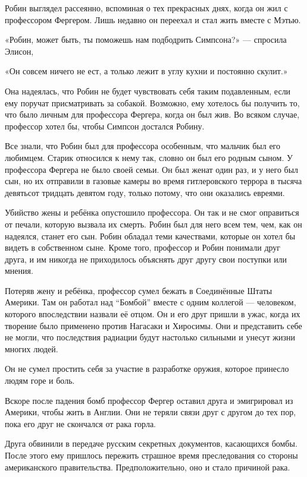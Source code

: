 \documentclass[a5paper, 9pt,
final, openany, twoside=true]{memoir}
\begin{document}
Робин выглядел рассеянно, вспоминая о тех прекрасных днях, когда он жил с профессором Фергером. Лишь недавно он переехал и стал жить вместе с Мэтью.\bigskip

«Робин, может быть, ты поможешь нам подбодрить Симпсона?» — спросила Элисон,

«Он совсем ничего не ест, а только лежит в углу кухни и постоянно скулит.»

Она надеялась, что Робин не будет чувствовать себя таким подавленным, если ему поручат присматривать за собакой. Возможно, ему хотелось бы получить то, что было личным для профессора Фергера, когда он был жив. Во всяком случае, профессор хотел бы, чтобы Симпсон достался Робину.

Все знали, что Робин был для профессора особенным, что мальчик был его любимцем. Старик относился к нему так, словно он был его родным сыном. У профессора Фергера не было своей семьи. Он был женат один раз, и у него был сын, но их отправили в газовые камеры во время гитлеровского террора в тысяча девятьсот тридцать девятом году, только потому, что они оказались евреями.

Убийство жены и ребёнка опустошило профессора. Он так и не смог оправиться от печали, которую вызвала их смерть. Робин был для него всем тем, чем, как он надеялся, станет его сын. Робин обладал теми качествами, которые он хотел бы видеть в собственном сыне. Кроме того, профессор и Робин понимали друг друга, и им никогда не приходилось объяснять друг другу свои поступки или мнения.

Потеряв жену и ребёнка, профессор сумел бежать в Соединённые Штаты Америки. Там он работал над ``Бомбой'' вместе с одним коллегой — человеком, которого впоследствии назвали её отцом. Он и его друг пришли в ужас, когда их творение было применено против Нагасаки и Хиросимы. Они и представить себе не могли, что последствия радиации будут настолько сильными и унесут жизни многих людей.

Он не сумел простить себя за участие в разработке оружия, которое принесло людям горе и боль.

Вскоре после падения бомб профессор Фергер оставил друга и эмигрировал из Америки, чтобы жить в Англии. Они не теряли связи друг с другом до тех пор, пока его друг не скончался от рака горла.

Друга обвинили в передаче русским секретных документов, касающихся бомбы. После этого ему пришлось пережить страшное время преследования со стороны американского правительства. Предположительно, оно и стало причиной рака.
\end{document}
